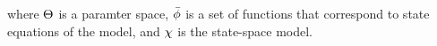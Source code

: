 \documentclass[../Article_Model_Parameters.tex]{subfiles}
\begin{document}
		where ${\color{black}\Theta}$ is a paramter space, ${\color{black}\bar{\phi}}$ is a set of functions that correspond to state equations of the model, and ${\color{black}\chi}$ is the state-space model.
		
		\fi
		
			
						
%			
%			
			
\end{document}

